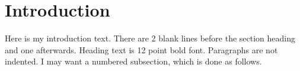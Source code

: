 \section{Introduction}
Here is my introduction text.  There are 2 blank lines 
before the section heading and one afterwards.  Heading 
text is 12 point bold font.  Paragraphs are not indented. 
I may want a numbered subsection, which is done as 
follows.

